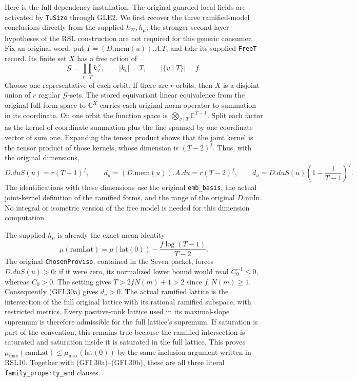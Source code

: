 Here is the full dependency installation.  The original guarded
local fields are activated by \texttt{TuSize} through GLE2.
We first recover the three ramified-model conclusions directly
from the supplied $h_W,h_\mu$; the stronger second-layer hypotheses
of the RSL construction are not required for this generic consumer.
Fix an original word, put $T=(D.\mathrm{mem}(u)).A.T$, and take
its supplied \texttt{FreeT} record.  Its finite set $X$ has a free
action of
\[
 \mathscr G=\prod_{v\mid T}k_v^\times,
 \qquad |k_v|=T,\qquad |\{v\mid T\}|=f.
\]
Choose one representative of each orbit.  If there are $r$ orbits,
then $X$ is a disjoint union of $r$ regular $\mathscr G$-sets.
The stored equivariant linear equivalence from the original full
form space to $\mathbb C^X$ carries each original norm operator
to summation in its coordinate.  On one orbit the function space
is $\bigotimes_{v\mid T}\mathbb C^{T-1}$.  Split each factor as
the kernel of coordinate summation plus the line spanned by one
coordinate vector of sum one.  Expanding the tensor product shows
that the joint kernel is the tensor product of those kernels,
whose dimension is $(T-2)^f$.  Thus, with the original dimensions,
\[
 D.duS(u)=r(T-1)^f,\qquad
 d_u=(D.\mathrm{mem}(u)).A.du=r(T-2)^f,
 \qquad d_u=D.duS(u)\left(1-\frac1{T-1}\right)^f.
                                                               \tag{GFI.30a}
\]
The identifications with these dimensions use the original
\texttt{emb\_basis}, the actual joint-kernel definition of the
ramified forms, and the range of the original $D.\mathrm{nuIn}$.
No integral or isometric version of the free model is needed for
this dimension computation.

The supplied $h_\mu$ is already the exact mean identity
\[
 \mu(\mathrm{ramLat})=\mu(\mathrm{lat}(0))
                         -\frac{f\log(T-1)}{T-2}.
                                                               \tag{GFI.30b}
\]
The original \texttt{ChosenProviso}, contained in the Seven packet,
forces $D.duS(u)>0$: if it were zero, its normalized lower bound
would read $C_0^{-1}\le0$, whereas $C_0>0$.
The setting gives $T>2fN(m)+1>2$ since $f,N(m)\ge1$.
Consequently (GFI.30a) gives $d_u>0$.
The actual ramified lattice is the intersection of the full original
lattice with its rational ramified subspace, with restricted metrics.
Every positive-rank lattice used in its maximal-slope supremum is
therefore admissible for the full lattice's supremum.  If saturation
is part of the convention, this remains true because the ramified
intersection is saturated and saturation inside it is saturated in
the full lattice.  This proves
$\mu_{\max}(\mathrm{ramLat})\le\mu_{\max}(\mathrm{lat}(0))$
by the same inclusion argument written in RSL10.  Together with
(GFI.30a)--(GFI.30b), these are all three literal
\texttt{family\_property\_and} clauses.

